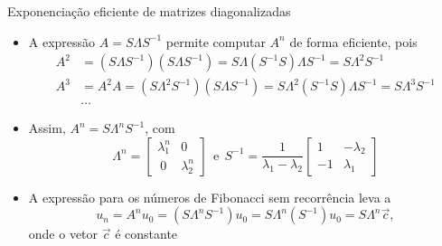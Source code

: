 \begin{frame}[fragile]{Exponenciação eficiente de matrizes diagonalizadas}

    \begin{itemize}
        \item A expressão $A = S\Lambda S^{-1}$ permite computar $A^n$ de forma eficiente, pois
        \begin{align*}
            A^2 &= (S\Lambda S^{-1})(S\Lambda S^{-1}) = S\Lambda (S^{-1}S)\Lambda S^{-1} = S\Lambda^2 S^{-1} \\
            A^3 &= A^2A = (S\Lambda^2 S^{-1})(S\Lambda S^{-1}) = S\Lambda^2 (S^{-1}S)\Lambda S^{-1} = S\Lambda^3 S^{-1} \\
        &\ldots
        \end{align*}

        \item Assim, $A^n = S\Lambda^n S^{-1}$, com
        \[
            \Lambda^n = \begin{bmatrix} \lambda_1^n & 0 \\\ 0 & \lambda_2^n \end{bmatrix}\ \ \mbox{e}\ \ 
            S^{-1} = \frac{1}{\lambda_1 - \lambda_2}\begin{bmatrix} 1 & -\lambda_2 \\ -1 & \lambda_1 \end{bmatrix}
        \]

        \item A expressão para os números de Fibonacci sem recorrência leva a
        \[
            u_n = A^nu_0 = (S\Lambda^n S^{-1})u_0 = S\Lambda^n (S^{-1})u_0
            = S\Lambda^n \vec{c},
        \]
        onde o vetor $\vec{c}$ é constante
    \end{itemize}

\end{frame}

